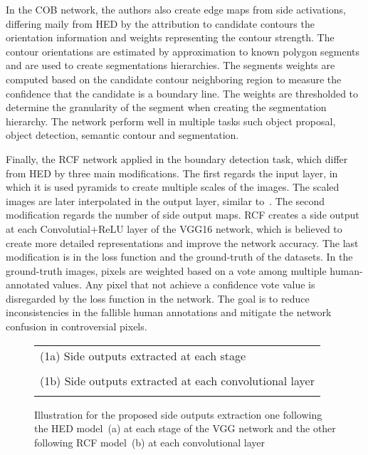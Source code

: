 In the COB network, the authors also create edge maps from side activations, differing maily from HED by the attribution to candidate contours the orientation information and weights representing the contour strength. The contour orientations are estimated by approximation to known polygon segments and are used to create segmentations hierarchies. The segments weights are computed based on the candidate contour neighboring region to measure the confidence that the candidate is a boundary line. The weights are thresholded to determine the granularity of the segment when creating the segmentation hierarchy. The network perform well in multiple tasks such object proposal, object detection, semantic contour and segmentation.


Finally, the RCF network applied in the boundary detection task, which differ from HED by three main modifications. The first regards the input layer, in which it is used pyramids to create multiple scales of the images. The scaled images are later interpolated in the output layer, similar to~\cite{farabet2012}. The second modification regards the number of side output maps. RCF creates a side output at each Convolutial+ReLU layer of the VGG16 network, which is believed to create more detailed representations and improve the network accuracy. The last modification is in the loss function and the ground-truth of the datasets. In the ground-truth images, pixels are weighted based on a vote among multiple human-annotated values. Any pixel that not achieve a confidence vote value is disregarded by the loss function in the network. The goal is to reduce inconsistencies in the fallible human annotations and mitigate the network confusion in controversial pixels.  


\begin{figure*}[!ht]
\begin{center}
\begin{tabular}{l}
(1a) Side outputs extracted at each stage\\
\\
(1b) Side outputs extracted at each convolutional layer\\
\\
\end{tabular}%
\caption{Illustration for  the proposed side outputs extraction one following the HED model~(a) at each stage of the VGG network and the other following RCF model~(b) at each convolutional layer}
\end{center}
\label{fig:methods}
\end{figure*}
